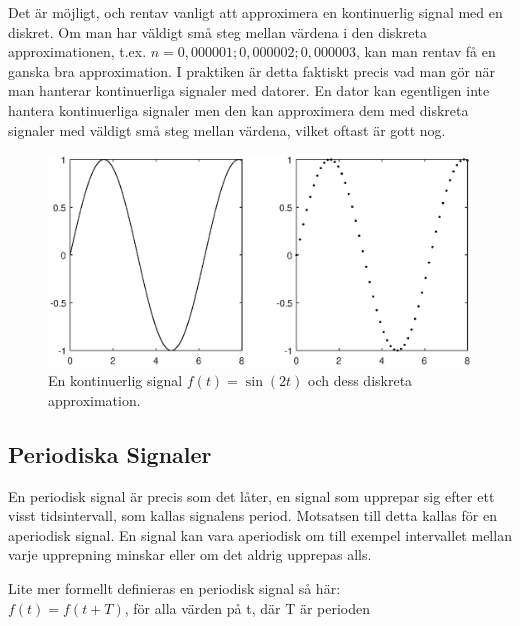 \documentclass{article}
\begin{document}
Det är möjligt, och rentav vanligt att approximera en kontinuerlig signal med en diskret. Om man har väldigt små steg mellan värdena i den diskreta approximationen, t.ex. $n={0,000001 ; 0,000002 ; 0,000003}$, kan man rentav få en ganska bra approximation. I praktiken är detta faktiskt precis vad man gör när man hanterar kontinuerliga signaler med datorer. En dator kan egentligen inte hantera kontinuerliga signaler men den kan approximera dem med diskreta signaler med väldigt små steg mellan värdena, vilket oftast är gott nog.

\begin{figure}[ht]
\centerline{\includegraphics[scale=0.55]{diskretisering.eps}}
\caption{En kontinuerlig signal $f(t) = \sin(2 t)$ och dess diskreta approximation.}
\label{}
\end{figure}

\subsection{Periodiska Signaler}
En periodisk signal är precis som det låter, en signal som upprepar sig efter ett visst tidsintervall, som kallas signalens period. Motsatsen till detta kallas för en aperiodisk signal.
En signal kan vara aperiodisk om till exempel intervallet mellan varje
upprepning minskar eller om det aldrig upprepas alls.

Lite mer formellt definieras en periodisk signal så här:\\
$f(t) = f(t+T)$, för alla värden på t, där T är perioden
\end{document}

